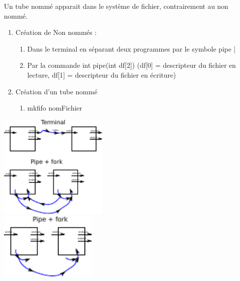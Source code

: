  Un tube nommé apparait dans le système de fichier, contrairement au non nommé. \\
	\begin{enumerate}
		\item Création de Non nommés :
		\begin{enumerate}
			\item Dans le terminal en séparant deux programmes par le symbole pipe | 
			\item Par la commande int pipe(int df[2]) (df[0] = descripteur du fichier en lecture, df[1] = descripteur du fichier en écriture)
		\end{enumerate}
		\item Création d'un tube nommé
		\begin{enumerate}
			\item mkfifo nomFichier
		\end{enumerate}
	\end{enumerate}
\includegraphics[width=200px]{fig35.pdf} \\
\includegraphics[width=180px]{fig36.pdf} \\
